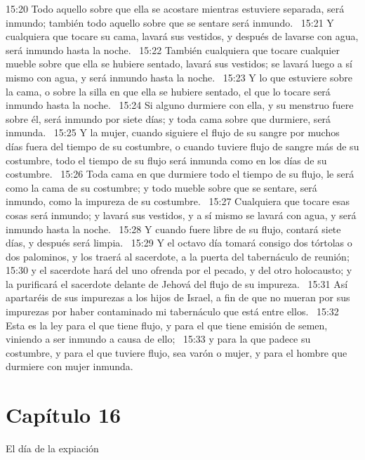 15:20 Todo aquello sobre que ella se acostare mientras estuviere separada, será inmundo; también todo aquello sobre que se sentare será inmundo.  
15:21 Y cualquiera que tocare su cama, lavará sus vestidos, y después de lavarse con agua, será inmundo hasta la noche.  
15:22 También cualquiera que tocare cualquier mueble sobre que ella se hubiere sentado, lavará sus vestidos; se lavará luego a sí mismo con agua, y será inmundo hasta la noche.  
15:23 Y lo que estuviere sobre la cama, o sobre la silla en que ella se hubiere sentado, el que lo tocare será inmundo hasta la noche.  
15:24 Si alguno durmiere con ella, y su menstruo fuere sobre él, será inmundo por siete días; y toda cama sobre que durmiere, será inmunda.  
15:25 Y la mujer, cuando siguiere el flujo de su sangre por muchos días fuera del tiempo de su costumbre, o cuando tuviere flujo de sangre más de su costumbre, todo el tiempo de su flujo será inmunda como en los días de su costumbre.  
15:26 Toda cama en que durmiere todo el tiempo de su flujo, le será como la cama de su costumbre; y todo mueble sobre que se sentare, será inmundo, como la impureza de su costumbre.  
15:27 Cualquiera que tocare esas cosas será inmundo; y lavará sus vestidos, y a sí mismo se lavará con agua, y será inmundo hasta la noche.  
15:28 Y cuando fuere libre de su flujo, contará siete días, y después será limpia.  
15:29 Y el octavo día tomará consigo dos tórtolas o dos palominos, y los traerá al sacerdote, a la puerta del tabernáculo de reunión;  
15:30 y el sacerdote hará del uno ofrenda por el pecado, y del otro holocausto; y la purificará el sacerdote delante de Jehová del flujo de su impureza.  
15:31 Así apartaréis de sus impurezas a los hijos de Israel, a fin de que no mueran por sus impurezas por haber contaminado mi tabernáculo que está entre ellos.  
15:32 Esta es la ley para el que tiene flujo, y para el que tiene emisión de semen, viniendo a ser inmundo a causa de ello;  
15:33 y para la que padece su costumbre, y para el que tuviere flujo, sea varón o mujer, y para el hombre que durmiere con mujer inmunda.  
\section*{Capítulo 16 }
El día de la expiación  

